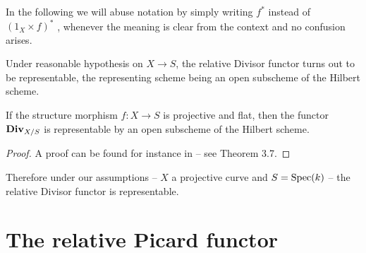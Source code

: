 	\begin{notation}
		In the following we will abuse notation by simply writing $f^*$ instead of $(1_X\times f)^*$ , whenever the meaning is clear from the context and no confusion arises.
	\end{notation}
	Under reasonable hypothesis on $X\to S$, the relative Divisor functor turns out to be representable, the representing scheme being an open subscheme of the Hilbert scheme.
	\begin{theo}\label{thm:div_representable}
		If the structure morphism $f:X\to S$ is projective and flat, then the functor $\operatorname{\mathbf{Div}}_{X/S}$ is representable by an open subscheme of the Hilbert scheme.
	\end{theo}
	\begin{proof}
		A proof can be found for instance in \cite{PICARD} -- see Theorem 3.7.
	\end{proof}
	Therefore under our assumptions -- $X$ a projective curve and $S=\operatorname{Spec}(k)$ -- the relative Divisor functor is representable.\\	

\section{The relative Picard functor}\label{sec:Pic_functor}
	
